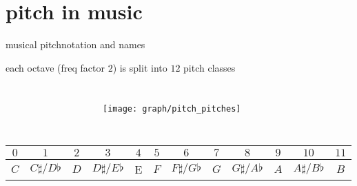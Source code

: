     \section[musical pitch]{pitch in music}
        \begin{frame}{musical pitch}{notation and names}
            
            each octave (freq factor $2$) is split into $12$ pitch classes
            \begin{columns}
            \begin{figure}
            \scalebox{.8}
            {
                
            }
            \end{figure}
            \begin{figure}
                \texttt{[image: graph/pitch\_pitches]}
            \end{figure}
            \end{columns}

            \begin{footnotesize}
                \begin{table}
                    \centering
                    \begin{tabular}{cccccccccccc} %
                        \\ \hline
                        \bf{\emph{$0$}}	 & \bf{\emph{$1$}}	 & \bf{\emph{$2$}}	 & \bf{\emph{$3$}}	 & \bf{\emph{$4$}}	 & \bf{\emph{$5$}}	 & \bf{\emph{$6$}}	 & \bf{\emph{$7$}}	 & \bf{\emph{$8$}}	 & \bf{\emph{$9$}}	 & \bf{\emph{$10$}}	 & \bf{\emph{$11$}}\\ 
                         \hline
                        \bf{$C$}	 & $C\sharp / D\flat$	 & $D$	 & $D\sharp / E\flat$	 & E	 & $F$	 & $F\sharp / G\flat$	 & $G$	 & $G\sharp / A\flat$	 & $A$	 & $A\sharp / B\flat$	 & $B$\\
                    \end{tabular}
                \end{table}
            \end{footnotesize}
        \end{frame}

